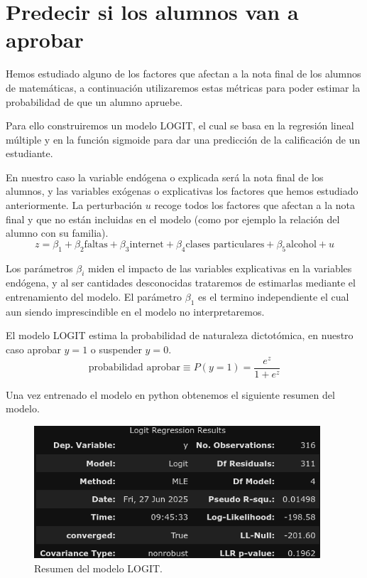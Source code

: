 \section{Predecir si los alumnos van a aprobar}

Hemos estudiado alguno de los factores que afectan a la nota final de los alumnos de matemáticas, a continuación utilizaremos estas métricas para poder estimar la probabilidad de que un alumno apruebe.

Para ello construiremos un modelo LOGIT, el cual se basa en la regresión lineal múltiple y en la función sigmoide para dar una predicción de la calificación de un estudiante.

En nuestro caso la variable endógena o explicada será la nota final de los alumnos, y las variables exógenas o explicativas los factores que hemos estudiado anteriormente. La perturbación $u$ recoge todos los factores que afectan a la nota final y que no están incluidas en el modelo (como por ejemplo la relación del alumno con su familia).
\begin{equation*}
        z = \beta_{1} + \beta_{2}\text{faltas} + \beta_{3}\text{internet} + \beta_{4} \text{clases particulares} + \beta_{5}\text{alcohol} + u
\end{equation*}

Los parámetros $\beta_{i}$ miden el impacto de las variables explicativas en la variables endógena, y al ser cantidades desconocidas trataremos de estimarlas mediante el entrenamiento del modelo. El parámetro $\beta_{1}$ es el termino independiente el cual aun siendo imprescindible en el modelo no interpretaremos.

El modelo LOGIT estima la probabilidad de naturaleza dictotómica, en nuestro caso aprobar $y=1$ o suspender $y=0$.
\begin{equation*}
    \text{probabilidad aprobar} \equiv P(y = 1) = \frac{e^{z}}{1 + e^{z}} 
\end{equation*}

Una vez entrenado el modelo en python obtenemos el siguiente resumen del modelo.
\begin{figure}[H]
    \begin{center}
        \includegraphics[width=0.95\textwidth]{figures/logit-summary.png}
    \end{center}
    \caption{Resumen del modelo LOGIT.}\label{fig:logit-summary}
\end{figure}

